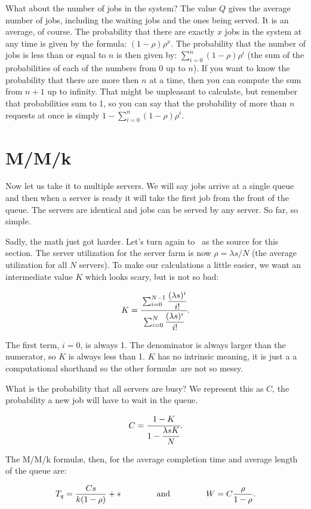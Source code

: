 \documentclass[a4paper]{report}
\begin{document}
What about the number of jobs in the system? The value $Q$ gives the average number of jobs, including the waiting jobs and the ones being served. It is an average, of course. The probability that there are exactly $x$ jobs in the system at any time is given by the formula: $(1-\rho)\rho^{x}$. The probability that the number of jobs is less than or equal to $n$ is then given by: $\sum\limits_{i=0}^{n}(1-\rho)\rho^{i}$ (the sum of the probabilities of each of the numbers from 0 up to $n$). If you want to know the probability that there are more then $n$ at a time, then you can compute the sum from $n+1$ up to infinity. That might be unpleasant to calculate, but remember that probabilities sum to 1, so you can say that the probability of more than $n$ requests at once is simply $1 - \sum\limits_{i=0}^{n}(1-\rho)\rho^{i}$.

\section*{M/M/k}

Now let us take it to multiple servers. We will say jobs arrive at a single queue and then when a server is ready it will take the first job from the front of the queue. The servers are identical and jobs can be served by any server. So far, so simple.

Sadly, the math just got harder. Let's turn again to~\cite{williams-q} as the source for this section. The server utilization for the server farm is now $\rho = \lambda s / N$ (the average utilization for all $N$ servers). To make our calculations a little easier, we want an intermediate value $K$ which looks scary, but is not so bad:

\[ K = \cfrac{\sum_{i=0}^{N-1}\dfrac{(\lambda s)^{i}}{i!}}{{\sum_{i=0}^{N}\dfrac{(\lambda s)^{i}}{i!}}}.
\]

The first term, $i = 0$, is always 1. The denominator is always larger than the numerator, so $K$ is always less than 1. $K$ has no intrinsic meaning, it is just a a computational shorthand so the other formul\ae\  are not so messy.

What is the probability that all servers are busy? We represent this as $C$, the probability a new job will have to wait in the queue.

\[C = \cfrac{1 - K}{1 - \dfrac{\lambda s K}{N}}.\]

The M/M/k formul\ae, then, for the average completion time and average length of the queue are:

\[
  T_{q} = \dfrac{C s}{k(1 - \rho)} + s \mbox{ \qquad\qquad and \qquad\qquad } W = C \dfrac{\rho}{1 - \rho}.
\]
\end{document}
